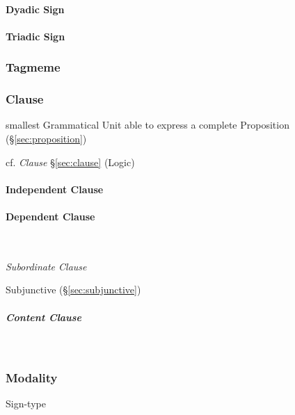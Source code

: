 \paragraph{Dyadic Sign}\label{sec:dyadic_sign}\hfill

\paragraph{Triadic Sign}\label{sec:triadic_sign}\hfill



\subsubsection{Tagmeme}\label{sec:tagmeme}

\subsubsection{Clause}\label{sec:grammatical_clause}

smallest Grammatical Unit able to express a complete Proposition
(\S\ref{sec:proposition})

cf. \emph{Clause} \S\ref{sec:clause} (Logic)



\paragraph{Independent Clause}\label{sec:independent_clause}\hfill

\paragraph{Dependent Clause}\label{sec:dependent_clause}\hfill \\\hfill

\emph{Subordinate Clause}

Subjunctive (\S\ref{sec:subjunctive})

\subparagraph{Content Clause}\label{sec:content_clause}\hfill \\\hfill



\subsubsection{Modality}\label{sec:syntax_modality}

Sign-type




